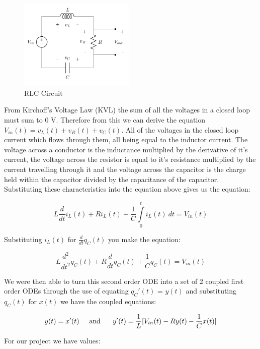 \documentclass[11pt,a4paper]{article}
\begin{document}
\begin{figure}
\vspace{-10mm}
  		\includegraphics[width=0.49\textwidth]{Ex3_Figs/RLC.png}
\vspace{-6mm}
  	\caption{RLC Circuit}
  	\label{fig:RLC}
\end{figure}


From Kirchoff's Voltage Law (KVL) the sum of all the voltages in a closed loop must sum to 0 V. Therefore from this we can derive the equation $V_{in}(t) = v_L(t)+v_R(t)+v_C(t)$. All of the voltages in the closed loop current which flows through them, all being equal to the inductor current. The voltage across a conductor is the inductance multiplied by the derivative of it's current, the voltage across the resistor is equal to it's resistance multiplied by the current travelling through it and the voltage across the capacitor is the charge held within the capacitor divided by the capacitance of the capacitor. Substituting these characteristics into the equation above gives us the equation:

\[ L \frac{d}{dt}i_L(t) + R i_L(t) + \frac{1}{C}\int\limits_0^t i_L(t) \ dt = V_{in}(t)\]

Substituting $i_L(t)$ for $\frac{d}{dt}q_C(t)$ you make the equation:

\[ L \frac{d^2}{dt^2}q_C(t) + R\frac{d}{dt}q_C(t) + \frac{1}{C}q_C(t) = V_{in}(t)\]

We were then able to turn this second order ODE into a set of 2 coupled first order ODEs through the use of equating $q_C'(t)$ = $y(t)$ and substituting $q_C(t)$ for $x(t)$ we have the coupled equations:

\[y(t) = x'(t) \text{\hspace{5mm}and \hspace{5mm}}y'(t) = \frac{1}{L}[V_{in}(t)  - Ry(t) - \frac{1}{C}x(t)] \]

For our project we have values:
\end{document}
